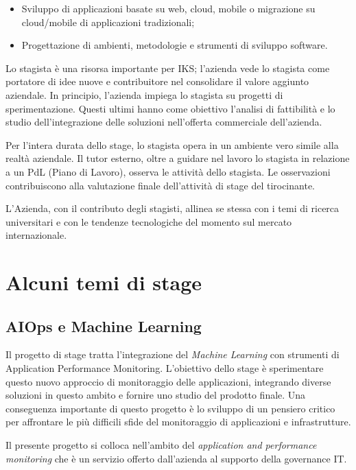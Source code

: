 \begin{itemize}
	\item Sviluppo di applicazioni basate su web, \gls{cloud}, mobile 
	      o migrazione su \gls{cloud}/mobile di applicazioni tradizionali;
	\item Progettazione di ambienti, metodologie e strumenti di 
	      sviluppo software.
\end{itemize}

Lo stagista è una risorsa importante per IKS; l'azienda vede lo stagista 
come portatore di idee nuove e contribuitore nel consolidare il valore 
aggiunto aziendale. In principio, l'azienda impiega lo stagista su progetti 
di sperimentazione. Questi ultimi hanno come obiettivo l'analisi di 
fattibilità e lo studio dell'integrazione delle soluzioni nell'offerta 
commerciale dell'azienda. 

Per l'intera durata dello stage, lo stagista opera in un ambiente vero 
simile alla realtà aziendale. Il tutor esterno, oltre a guidare nel lavoro 
lo stagista in relazione a un PdL (Piano di Lavoro), osserva le attività 
dello stagista. Le osservazioni contribuiscono alla valutazione finale 
dell'attività di stage del tirocinante.

L'Azienda, con il contributo degli stagisti, allinea se stessa con i 
temi di ricerca universitari e con le tendenze tecnologiche del momento 
sul mercato internazionale.

\section{Alcuni temi di stage}
\subsection{AIOps e Machine Learning}
Il progetto di stage tratta l'integrazione del \textit{Machine Learning} 
con strumenti di Application Performance Monitoring. L'obiettivo dello 
stage è sperimentare questo nuovo approccio di monitoraggio delle applicazioni, 
integrando diverse soluzioni in questo ambito e fornire uno studio del 
prodotto finale. Una conseguenza importante di questo progetto è lo 
sviluppo di un pensiero critico per affrontare le più difficili sfide 
del monitoraggio di applicazioni e infrastrutture. 

Il presente progetto si colloca nell'ambito del 
\textit{application and performance monitoring} che è un 
servizio offerto dall'azienda al supporto della governance IT. 


